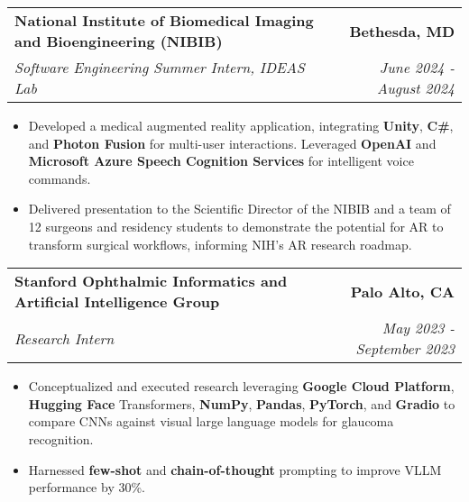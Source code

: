 \documentclass[letterpaper,11pt]{article}
\makeatletter
\newcommand{\resumeItem}[1]{
  \item\small{
    {#1 \vspace{-3pt}}
  }
}
\newcommand{\resumeSubheading}[4]{
  \vspace{-3pt}\item
    \begin{tabular*}{1.0\textwidth}[t]{l@{\extracolsep{\fill}}r}
      \textbf{#1} & \textbf{\small #2} \\
      \textit{\small#3} & \textit{\small #4} \\
    \end{tabular*}\vspace{-7pt}
}
\newcommand{\resumeSubheadingContinue}[2]{
  \vspace{-3pt}
    \begin{tabular*}{1.0\textwidth}[t]{l@{\extracolsep{\fill}}r}
      \textit{\small#1} & \textit{\small #2} \\
    \end{tabular*}\vspace{-7pt}
}
\newcommand{\resumeItemListStart}{\begin{itemize}}
\newcommand{\resumeItemListEnd}{\end{itemize}\vspace{0pt}}
\makeatother
\begin{document}
        \resumeSubheading
        {National Institute of Biomedical Imaging and Bioengineering (NIBIB)}{Bethesda, MD}
            {Software Engineering Summer Intern, IDEAS Lab}{June 2024 - August 2024}
            \resumeItemListStart
                \resumeItem{Developed a medical augmented reality application, integrating \textbf{Unity}, \textbf{C\#}, and \textbf{Photon Fusion} for multi-user interactions. Leveraged \textbf{OpenAI} and \textbf{Microsoft Azure Speech Cognition Services} for intelligent voice commands.}
                \resumeItem{Delivered presentation to the Scientific Director of the NIBIB and a team of 12 surgeons and residency students to demonstrate the potential for AR to transform surgical workflows, informing NIH’s AR research roadmap.}
            \resumeItemListEnd


        \resumeSubheading
        {Stanford Ophthalmic Informatics and Artificial Intelligence Group}{Palo Alto, CA}
            {Research Intern}{May 2023 - September 2023}
            \resumeItemListStart
                \resumeItem{Conceptualized and executed research leveraging \textbf{Google Cloud Platform}, \textbf{Hugging Face} Transformers, \textbf{NumPy}, \textbf{Pandas}, \textbf{PyTorch}, and \textbf{Gradio} to compare CNNs against visual large language models for glaucoma recognition.}
                \resumeItem{Harnessed \textbf{few-shot} and \textbf{chain-of-thought} prompting to improve VLLM performance by 30\%.}
            \resumeItemListEnd
            
            
\end{document}
